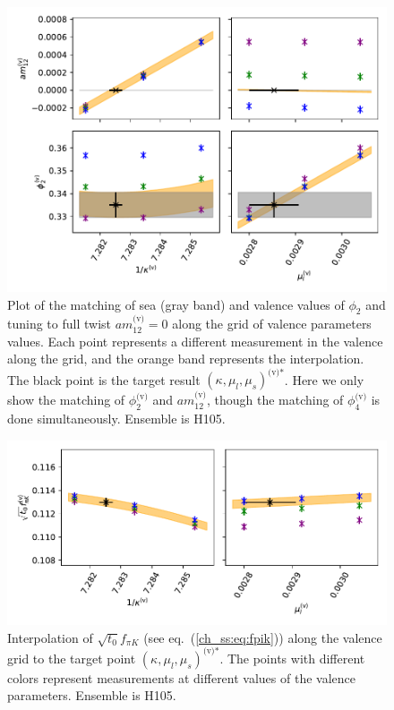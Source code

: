 \begin{figure}
    \centering
    \includegraphics[width=1.\textwidth]{./cap4/figs/matching_H105.pdf}
    \caption{Plot of the matching of sea (gray band) and valence values of $\phi_2$ and tuning to full twist $am_{12}^{\textrm{(v)}}=0$ along the grid of valence parameters values. Each point represents a different measurement in the valence along the grid, and the orange band represents the interpolation. The black point is the target result $\left(\kappa,\mu_l,\mu_s\right)^{\textrm{(v)*}}$. Here we only show the matching of $\phi_2^{\textrm{(v)}}$ and $am_{12}^{\textrm{(v)}}$, though the matching of $\phi_4^{\textrm{(v)}}$ is done simultaneously. Ensemble is H105.}
    \label{ch_ma:fig:match}
\end{figure}

\begin{figure}
    \centering
    \includegraphics[width=1.\textwidth]{./cap4/figs/interp_fpik_H105.pdf}
    \caption{Interpolation of $\sqrt{t_0}f_{\pi K}$ (see eq.~(\ref{ch_ss:eq:fpik})) along the valence grid to the target point $\left(\kappa,\mu_l,\mu_s\right)^{\textrm{(v)*}}$. The points with different colors represent measurements at different values of the valence parameters. Ensemble is H105.}
    \label{ch_ma:fig:fpik_interp}
\end{figure}


